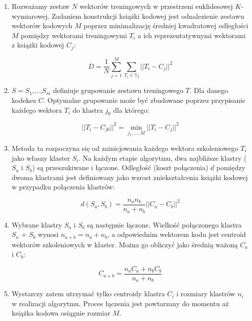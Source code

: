 \documentclass{article}
\begin{document}
\begin{enumerate}
  \item Rozważamy zestaw $N$ wektorów treningowych w przestrzeni euklidesowej $K$-wymiarowej.
        Zadaniem konstrukcji książki kodowej jest odnalezienie zestawu wektorów kodowych $M$ poprzez minimalizację
        średniej kwadratowej odległości $M$ pomiędzy wektorami treningowymi $T_{i}$ a ich reprezentatywnymi wektorami z książki kodowej $C_{j}$:

        \begin{equation}
          D = \frac{1}{N} \sum_{j=1}^M \sum_{T_{i}\in\mathbb{S_{j}}} ||T_{i} - C_{j}||^2
        \end{equation}

  \item $S=S_{1}$,...,$S_{m}$ definiuje grupowanie zestawu treningowego $T$.
        Dla danego kodeksu $C$.
        Optymalne grupowanie może być zbudowane poprzez przypisanie każdego wektora $T_{i}$ do klastra $j_{0}$ dla którego:

        \begin{equation}
          ||T_{i} - C_{j0}||^2 = \displaystyle \min_{j_1,\dots ,M} ||T_{i} - C_{j}||^2
        \end{equation}

  \item Metoda ta rozpoczyna się od zainicjowania każdego wektora szkoleniowego $T_{i}$ jako własny klaster $S_{i}$.
        Na każdym etapie algorytmu, dwa najbliższe klastry ($S_{a}$ i $S_{b}$) są przeszukiwane i łączone.
        Odległość (koszt połączenia) $d$ pomiędzy dwoma klastrami jest definiowany jako wzrost zniekształcenia książki kodowej w przypadku połączenia klastrów:

        \begin{equation}
          d(S_{a}, S_{b}) = \frac{n_{a}n_{b}}{n_{a} + n_{b}} || C_{a} - C_{b} ||^2
        \end{equation}

  \item Wybrane klastry $S_{a}$ i $S_{b}$ są następnie łączone. Wielkość połączonego klastra $S_{a}$ + $S_{b}$ wynosi $n_{a+b} = n_{a} + n_{b}$,
        a odpowiednim wektorem kodu jest centroid wektorów szkoleniowych w klaster. Można go obliczyć jako średnią ważoną $C_{a}$ i $C_{b}$:

        \begin{equation}
          C_{a + b} = \frac{n_{a}C_{a} + n_{b}C_{b}}{n_{a} + n_{b}}
        \end{equation}
        
  \item Wystarczy zatem utrzymać tylko centroidy klastra $C_{i}$ i rozmiary klastrów $n_{i}$ w realizacji algorytmu.
        Proces łączenia jest powtarzany do momentu aż książka kodowa osiągnie rozmiar $M$. 
        
\end{enumerate}
\end{document}
